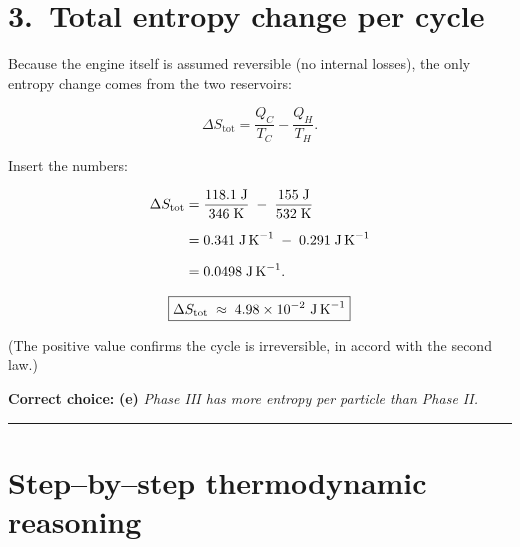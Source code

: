 \documentclass[12pt]{article}
\theoremstyle{definition} %
\theoremstyle{plain} %
\begin{document}
\section*{3.\ Total entropy change per cycle}

Because the engine itself is assumed reversible (no internal losses),
the only entropy change comes from the two reservoirs:

\[
\Delta S_{\text{tot}}
  = \frac{Q_C}{T_C} - \frac{Q_H}{T_H}.
\]

Insert the numbers:

\[
\begin{aligned}
\Delta S_{\text{tot}}
  &= \frac{118.1\;\text{J}}{346\;\text{K}}
     \;-\;
     \frac{155\;\text{J}}{532\;\text{K}} \\[6pt]
  &= 0.341\;\text{J\,K}^{-1}
     \;-\;
     0.291\;\text{J\,K}^{-1} \\[6pt]
  &= 0.0498\;\text{J\,K}^{-1}.
\end{aligned}
\]

\[
\boxed{\Delta S_{\text{tot}} \;\approx\; 4.98 \times 10^{-2}\ \text{J\,K}^{-1}}
\]

(The positive value confirms the cycle is irreversible, in accord with
the second law.)

\textbf{Correct choice:} \textbf{(e)} \emph{Phase III has more entropy per particle than Phase II.}

\bigskip
\hrule
\bigskip

\section*{Step–by–step thermodynamic reasoning}
\end{document}
